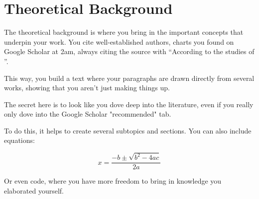 \chapter{Theoretical Background}
\label{chap:fundamentacao}

The theoretical background is where you bring in the important concepts that underpin your work. You cite well-established authors, charts you found on Google Scholar at 2am, always citing the source with \enquote{According to the studies of \cite{Ding2020AdversarialAttacks}}.

This way, you build a text where your paragraphs are drawn directly from several works, showing that you aren't just making things up.

The secret here is to look like you dove deep into the literature, even if you really only dove into the Google Scholar "recommended" tab.

To do this, it helps to create several subtopics and sections. You can also include equations:

\begin{equation}
    x = \frac{-b \pm \sqrt{b^2 - 4ac}}{2a}
    \label{eq:quadratic}
\end{equation}

Or even code, where you have more freedom to bring in knowledge you elaborated yourself.


\hfill
\begin{minipage}[t]{.65\textwidth}
\fonteautor
\end{minipage}

